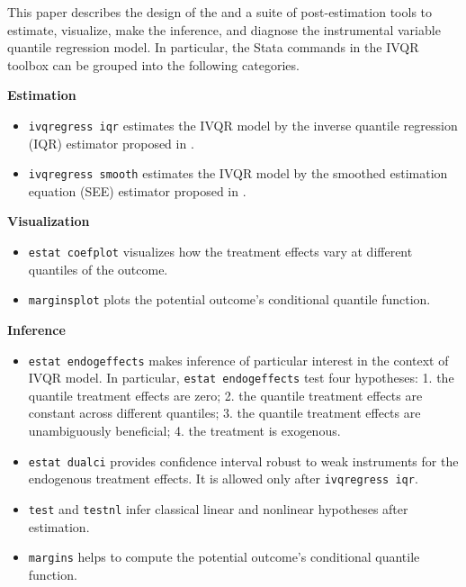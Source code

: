 This paper describes the design of the {\ivqreg} and a suite of post-estimation
tools to estimate, visualize, make the inference, and diagnose the instrumental
variable quantile regression model. In particular, the Stata commands in the
IVQR toolbox can be grouped into the following categories.

\begin{description}
  \item{\bf Estimation}
    \begin{itemize}
      \item {\tt ivqregress iqr} estimates the IVQR model by the inverse
	quantile regression (IQR) estimator proposed in \cite{Chernozhukov2006}.
	\item {\tt ivqregress smooth} estimates the IVQR model by the smoothed
	  estimation equation (SEE) estimator proposed in \cite{Kaplan2017}.
    \end{itemize}

  \item{\bf Visualization}
    \begin{itemize}
      \item {\tt estat coefplot} visualizes how the treatment effects vary at
	different quantiles of the outcome.

	\item {\tt marginsplot} plots the potential outcome's conditional
	  quantile function.
    \end{itemize}

  \item{\bf Inference} 
    \begin{itemize}
      \item {\tt estat endogeffects} makes inference of particular interest in
	the context of IVQR model. In particular, {\tt estat endogeffects} test
	four hypotheses: 1. the quantile treatment effects are zero; 2. the
	quantile treatment effects are  constant across different quantiles; 3.
	the quantile treatment effects are unambiguously beneficial; 4. the
	treatment is exogenous.

     \item {\tt estat dualci} provides confidence interval robust to weak
       instruments for the endogenous treatment effects. It is allowed only
       after {\tt ivqregress iqr}.

      \item {\tt test} and {\tt testnl} infer classical linear and
	nonlinear hypotheses after estimation.

      \item {\tt margins} helps to compute the potential outcome's conditional
	quantile function.


\end{itemize}
\end{description}
